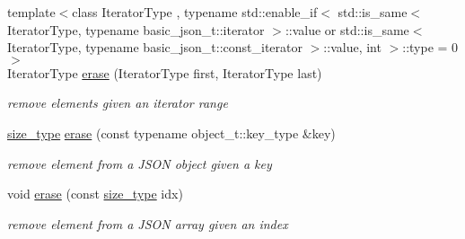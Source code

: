\begin{DoxyCompactItemize}
{\footnotesize template$<$class Iterator\+Type , typename std\+::enable\+\_\+if$<$ std\+::is\+\_\+same$<$ Iterator\+Type, typename basic\+\_\+json\+\_\+t\+::iterator $>$\+::value or std\+::is\+\_\+same$<$ Iterator\+Type, typename basic\+\_\+json\+\_\+t\+::const\+\_\+iterator $>$\+::value, int $>$\+::type  = 0$>$ }\\Iterator\+Type \hyperlink{classnlohmann_1_1basic__json_a4b3f7eb2d4625d95a51fbbdceb7c5f39}{erase} (Iterator\+Type first, Iterator\+Type last)
\begin{DoxyCompactList}\small\item\em remove elements given an iterator range \end{DoxyCompactList}\item 
\hyperlink{classnlohmann_1_1basic__json_a39f2cd0b58106097e0e67bf185cc519b}{size\+\_\+type} \hyperlink{classnlohmann_1_1basic__json_a2f8484d69c55d8f2a9697a7bec29362a}{erase} (const typename object\+\_\+t\+::key\+\_\+type \&key)
\begin{DoxyCompactList}\small\item\em remove element from a J\+S\+ON object given a key \end{DoxyCompactList}\item 
void \hyperlink{classnlohmann_1_1basic__json_a88cbcefe9a3f4d294bed0653550a5cb9}{erase} (const \hyperlink{classnlohmann_1_1basic__json_a39f2cd0b58106097e0e67bf185cc519b}{size\+\_\+type} idx)
\begin{DoxyCompactList}\small\item\em remove element from a J\+S\+ON array given an index \end{DoxyCompactList}\end{DoxyCompactItemize}
